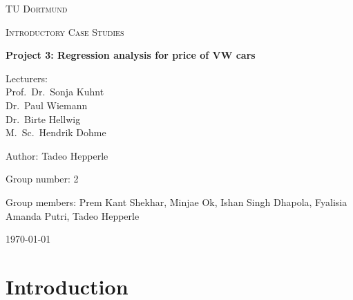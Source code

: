 \documentclass[12 pt]{scrartcl}
\begin{document}
\begin{titlepage}
  \centering
  {\scshape\LARGE TU Dortmund \par}
  \vspace{1cm}
  {\scshape\Large Introductory Case Studies \par}
  \vspace{2cm}
  {\huge\bfseries Project 3: Regression analysis for price of VW cars\par}
  \vspace{2cm}
  {\Large Lecturers:\\
    Prof.\ Dr.\ Sonja Kuhnt\\
    Dr.\ Paul Wiemann\\
    Dr.\ Birte Hellwig\\
    M.\ Sc.\ Hendrik Dohme \par}
  \vspace{1cm}
  {\Large Author: Tadeo Hepperle \par}
  \vspace{0.5 cm}
  {\Large Group number: 2\par}
  \vspace{0.5 cm}
  {\Large Group members: Prem Kant Shekhar, Minjae Ok, Ishan Singh Dhapola, Fyalisia Amanda Putri, Tadeo Hepperle}
  \vfill
  {\large \today\par}
\end{titlepage}


\tableofcontents

\cleardoublepage

\section{Introduction}
\end{document}
